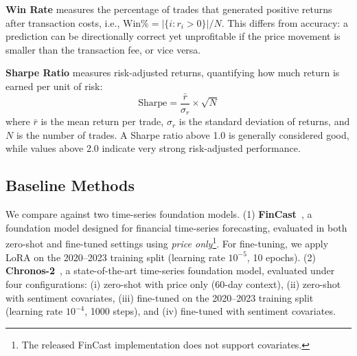 \documentclass[a4paper,10pt,conference]{IEEEtran}
\begin{document}
\textbf{Win Rate} measures the percentage of trades that generated positive returns after transaction costs, i.e., $\text{Win\%} = |\{i : r_i > 0\}| / N$. This differs from accuracy: a prediction can be directionally correct yet unprofitable if the price movement is smaller than the transaction fee, or vice versa.

\textbf{Sharpe Ratio} \cite{sharpe1966} measures risk-adjusted returns, quantifying how much return is earned per unit of risk:
\begin{equation}
\text{Sharpe} = \frac{\bar{r}}{\sigma_r} \times \sqrt{N}
\end{equation}
where $\bar{r}$ is the mean return per trade, $\sigma_r$ is the standard deviation of returns, and $N$ is the number of trades.
A Sharpe ratio above 1.0 is generally considered good, while values above 2.0 indicate very strong risk-adjusted performance.

\subsection{Baseline Methods}

We compare against two time-series foundation models. 
(1) \textbf{FinCast}~\cite{zhu2025fincast}, a foundation model designed for financial time-series forecasting, evaluated in both zero-shot and fine-tuned settings using \emph{price only}\footnote{The released FinCast implementation does not support covariates.}. For fine-tuning, we apply LoRA on the 2020--2023 training split (learning rate $10^{-5}$, 10 epochs). 
(2) \textbf{Chronos-2}~\cite{ansari2025chronos}, a state-of-the-art time-series foundation model, evaluated under four configurations: (i) zero-shot with price only (60-day context), (ii) zero-shot with sentiment covariates, (iii) fine-tuned on the 2020--2023 training split (learning rate $10^{-4}$, 1000 steps), and (iv) fine-tuned with sentiment covariates.
\end{document}
